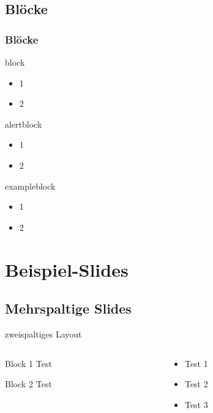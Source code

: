 \documentclass[t]{beamer}
\begin{document}
\subsection{Blöcke}
\begin{frame}
    \frametitle{Blöcke}
    \begin{block}{block}
        \begin{itemize}
            \item 1
            \item 2
        \end{itemize}
    \end{block}
    \begin{alertblock}{alertblock}
        \begin{itemize}
            \item 1
            \item 2
        \end{itemize}
    \end{alertblock}
    \begin{exampleblock}{exampleblock}
        \begin{itemize}
            \item 1
            \item 2
        \end{itemize}
    \end{exampleblock}
\end{frame}

\section{Beispiel-Slides}
\subsection{Mehrspaltige Slides}
\begin{frame}{zweispaltiges Layout}
    \begin{columns}
        \begin{column}{0.49\textwidth}
            \begin{block}{Block 1}
                Test
            \end{block}
            \begin{block}{Block 2}
                Test
            \end{block}
        \end{column}
        \begin{column}{0.49\textwidth}
            \begin{itemize}
                \item Test 1
                \item Test 2
                \item Test 3
            \end{itemize}
        \end{column}
    \end{columns}
\end{frame}
\end{document}
